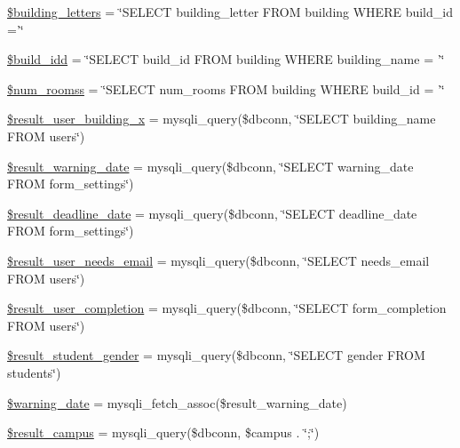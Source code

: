\begin{DoxyCompactItemize}
\item 
\hyperlink{admin__view_2index_8php_ab7c3ef21f41bcddbed5d1f3b591342da}{\$building\-\_\-letters} = \char`\"{}\-S\-E\-L\-E\-C\-T building\-\_\-letter \-F\-R\-O\-M building \-W\-H\-E\-R\-E build\-\_\-id ='\char`\"{}
\item 
\hyperlink{admin__view_2index_8php_a6671599aee303444a6ccd2d2226630dd}{\$build\-\_\-idd} = \char`\"{}\-S\-E\-L\-E\-C\-T build\-\_\-id \-F\-R\-O\-M building \-W\-H\-E\-R\-E building\-\_\-name = '\char`\"{}
\item 
\hyperlink{admin__view_2index_8php_a042bc70123c1cedbe0ebc14950c86267}{\$num\-\_\-roomss} = \char`\"{}\-S\-E\-L\-E\-C\-T num\-\_\-rooms \-F\-R\-O\-M building \-W\-H\-E\-R\-E build\-\_\-id = '\char`\"{}
\item 
\hyperlink{admin__view_2index_8php_ac87f45c9f62c3f0628eef67281f382b3}{\$result\-\_\-user\-\_\-building\-\_\-x} = mysqli\-\_\-query(\$dbconn, \char`\"{}\-S\-E\-L\-E\-C\-T building\-\_\-name \-F\-R\-O\-M users\char`\"{})
\item 
\hyperlink{admin__view_2index_8php_a4cb926b56b2c25912bf67859aacab6d4}{\$result\-\_\-warning\-\_\-date} = mysqli\-\_\-query(\$dbconn, \char`\"{}\-S\-E\-L\-E\-C\-T warning\-\_\-date \-F\-R\-O\-M form\-\_\-settings\char`\"{})
\item 
\hyperlink{admin__view_2index_8php_ad61a3f443fc1856c2ba99dfde9affc8c}{\$result\-\_\-deadline\-\_\-date} = mysqli\-\_\-query(\$dbconn, \char`\"{}\-S\-E\-L\-E\-C\-T deadline\-\_\-date \-F\-R\-O\-M form\-\_\-settings\char`\"{})
\item 
\hyperlink{admin__view_2index_8php_aafa48812b4607e55b823158f58b39185}{\$result\-\_\-user\-\_\-needs\-\_\-email} = mysqli\-\_\-query(\$dbconn, \char`\"{}\-S\-E\-L\-E\-C\-T needs\-\_\-email \-F\-R\-O\-M users\char`\"{})
\item 
\hyperlink{admin__view_2index_8php_a0acda6e82914708d1666c0f04deacbfb}{\$result\-\_\-user\-\_\-completion} = mysqli\-\_\-query(\$dbconn, \char`\"{}\-S\-E\-L\-E\-C\-T form\-\_\-completion \-F\-R\-O\-M users\char`\"{})
\item 
\hyperlink{admin__view_2index_8php_adff53f8f2492a44a21e49f4a86980b2e}{\$result\-\_\-student\-\_\-gender} = mysqli\-\_\-query(\$dbconn, \char`\"{}\-S\-E\-L\-E\-C\-T gender \-F\-R\-O\-M students\char`\"{})
\item 
\hyperlink{admin__view_2index_8php_a6e9f4ec234df3b3983352f341b57f8ba}{\$warning\-\_\-date} = mysqli\-\_\-fetch\-\_\-assoc(\$result\-\_\-warning\-\_\-date)
\item 
\hyperlink{admin__view_2index_8php_afdd2ad9cb7726ebdf33d1095eac78a1a}{\$result\-\_\-campus} = mysqli\-\_\-query(\$dbconn, \$campus . \char`\"{};\char`\"{})

\end{DoxyCompactItemize}
